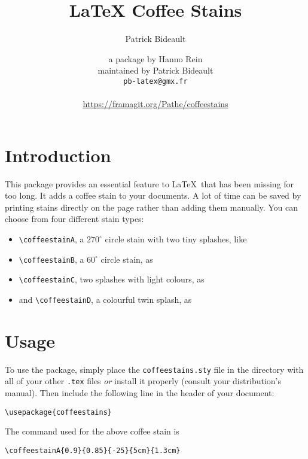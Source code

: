 \documentclass[a4paper, 11pt, BCOR = 0 pt, oneside, english]{scrartcl}
\author{Patrick Bideault}
\begin{document}
\title{LaTeX Coffee Stains}
\author{a package by Hanno Rein\\
  maintained by Patrick Bideault\\
  \texttt{pb-latex@gmx.fr}\\
  ~\\
  \url{https://framagit.org/Pathe/coffeestains}}
\renewcommand{\today}{version \gitRel{} -- \DTMtoday{}}
\maketitle

\label{stainA}
\section{Introduction}
This package provides an essential feature to \LaTeX~that has been missing for
too long. It adds a coffee stain to your documents. A lot of time can be saved
by printing stains directly on the page rather than adding them manually. You can
choose from four different stain types:
\begin{itemize}
\item \verb|\coffeestainA|, a $270^\circ$ circle stain with two tiny splashes, like 
\item \verb|\coffeestainB|, a $60^\circ$ circle stain, as 
\item \verb|\coffeestainC|, two splashes with light colours, as 
\item and \verb|\coffeestainD|, a colourful twin splash, as 
\end{itemize}

\section{Usage}
To use the package, simply place the \texttt{coffeestains.sty} file in the directory with all of your 
other \texttt{.tex} files \textit{or} install it properly (consult your distribution's manual). 
Then include the following line in the header of your document:
\begin{verbatim}
\usepackage{coffeestains}
\end{verbatim}

\vfill{}

\begin{tcolorbox}
  The command used for the above coffee stain is

  \verb|\coffeestainA{0.9}{0.85}{-25}{5cm}{1.3cm}|
\end{tcolorbox}
\newpage{}
\label{stainB}
\end{document}
